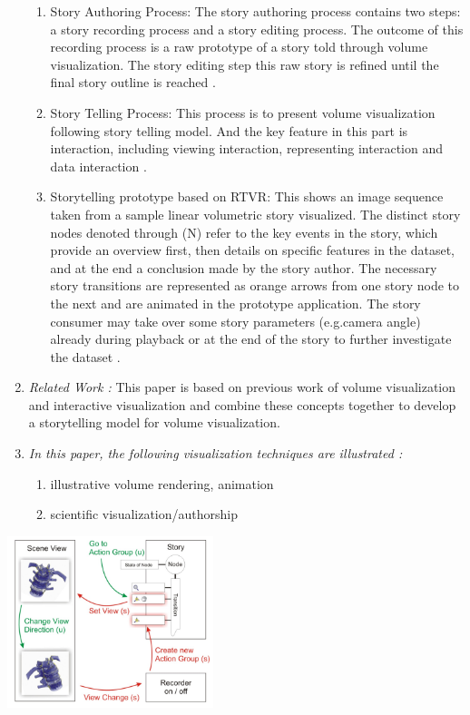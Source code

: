 \documentclass{egpubl}
\begin{document}
\begin{enumerate}
\begin{enumerate}
\item Story Authoring Process: The story authoring process contains two steps: a story recording process and a story editing process. The outcome of this recording process is a raw prototype of a story told through volume visualization. The story editing step this raw story is refined until the final story outline is reached \cite{wohlfat}.
\item Story Telling Process: This process is to present volume visualization following story telling model. And the key feature in this part is interaction, including viewing interaction, representing interaction and data interaction \cite{wohlfat}.
\item Storytelling prototype based on RTVR: This shows an image sequence taken from a sample linear volumetric story visualized. The distinct story nodes denoted through (N) refer to the key events in the story, which provide an overview first, then details on specific features in the dataset, and at the end a conclusion made by the story author. The necessary story transitions are represented as orange arrows from one story node to the next and are animated in the prototype application. The story consumer may take over some story parameters (e.g.camera angle) already during playback or at the end of the story to further investigate the dataset \cite{wohlfat}.
\end{enumerate}
\item \textit{Related Work :}  This paper is based on previous work of volume visualization \cite{Amy,robert,Ivan} and interactive visualization \cite{merlin}and combine these concepts together to develop a storytelling model for volume visualization.
\item \textit{In this paper, the following visualization techniques are illustrated :} 
\begin{enumerate}
\item illustrative volume rendering, animation
\item scientific visualization/authorship
\end{enumerate}
\end{enumerate}
\begingroup
\centering
\includegraphics[width=6cm]{./images/VRVis-Wohlfart-Michael}
\label{fig:VRVis-Wohlfart-Michael}
\endgroup
\end{document}
